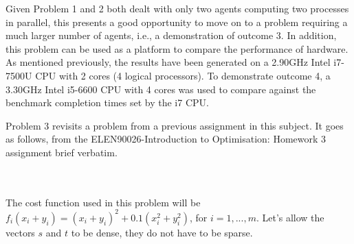 \documentclass[12pt]{article}
\begin{document}
Given Problem 1 and 2 both dealt with only two agents computing two processes in parallel, this presents a good opportunity to move on to a problem requiring a much larger number of agents, i.e., a demonstration of outcome 3. In addition, this problem can be used as a platform to compare the performance of hardware. As mentioned previously, the results have been generated on a 2.90GHz Intel i7-7500U CPU with 2 cores (4 logical processors). To demonstrate outcome 4, a 3.30GHz Intel i5-6600 CPU with 4 cores was used to compare against the benchmark completion times set by the i7 CPU.

Problem 3 revisits a problem from a previous assignment in this subject. It goes as follows, from the ELEN90026-Introduction to Optimisation: Homework 3 assignment brief verbatim.

\noindent{}\\\\

The cost function used in this problem will be $f_i(x_i+y_i)=(x_i+y_i)^2+0.1(x_i^2+y_i^2)$, for $i=1,...,m$. Let's allow the vectors $s$ and $t$ to be dense, they do not have to be sparse.
\end{document}
